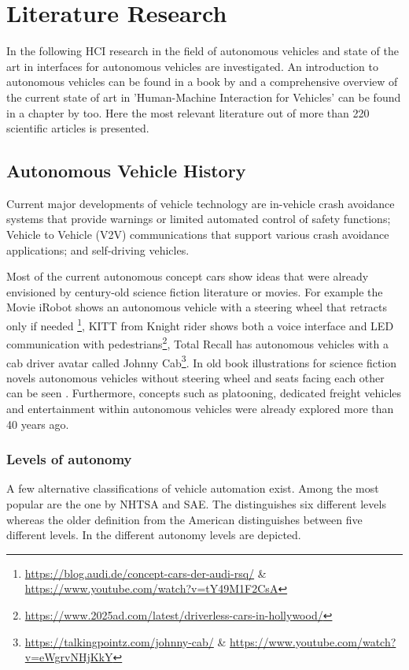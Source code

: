 \chapter{Literature Research}
\label{ch:literature}

In the following HCI research in the field of autonomous vehicles and state of the art in interfaces for autonomous vehicles are investigated. An introduction to autonomous vehicles can be found in a book by \citet{Lipson:2017:DIC:3175814} and a comprehensive overview of the current state of art in 'Human-Machine Interaction for Vehicles' can be found in a chapter by \citet{Kun2018} too. Here the most relevant literature out of more than 220 scientific articles is presented. 

\section{Autonomous Vehicle History}\label{sec:history}
Current major developments of vehicle technology are in-vehicle crash avoidance systems that provide warnings or limited automated control of safety functions; Vehicle to Vehicle (V2V) communications that support various crash avoidance applications; and self-driving vehicles. 

Most of the current autonomous concept cars show ideas that were already envisioned by century-old science fiction literature or movies. For example the Movie iRobot shows an autonomous vehicle with a steering wheel that retracts only if needed \footnote{\url{https://blog.audi.de/concept-cars-der-audi-rsq/} \& \url{https://www.youtube.com/watch?v=tY49M1F2CsA}}, KITT from Knight rider shows both a voice interface and LED communication with pedestrians\footnote{\url{https://www.2025ad.com/latest/driverless-cars-in-hollywood/}}, Total Recall has autonomous vehicles with a cab driver avatar called Johnny Cab\footnote{\url{https://talkingpointz.com/johnny-cab/} \& \url{https://www.youtube.com/watch?v=eWgrvNHjKkY}}. In old book illustrations for science fiction novels autonomous vehicles without steering wheel and seats facing each other can be seen \citep{Radtke1974DieMorgen}. Furthermore, concepts such as platooning, dedicated freight vehicles and entertainment within autonomous vehicles were already explored more than 40 years ago. 

\subsection{Levels of autonomy}\label{ssec:levels}
A few alternative classifications of vehicle automation exist. Among the most popular are the one by NHTSA and SAE. The \citet{SAEinternational2016} distinguishes six different levels whereas the older definition from the American \cite{NHTSA2013}  distinguishes between five different levels. In \emph{} the different autonomy levels are depicted. 

